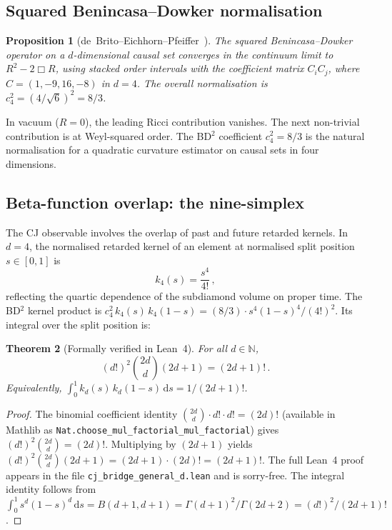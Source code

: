 \documentclass[12pt,a4paper]{article}
\theoremstyle{plain}
\newtheorem{theorem}{Theorem}[section]
\newtheorem{proposition}[theorem]{Proposition}
\theoremstyle{definition}
\theoremstyle{remark}
\newcommand{\dd}{\mathrm{d}}
\begin{document}
\subsection{Squared Benincasa--Dowker normalisation}
\label{sec:bd2}

\begin{proposition}[de~Brito--Eichhorn--Pfeiffer~\cite{deBrito:2023}]
\label{prop:bd2}
The squared Benincasa--Dowker operator on a $d$-dimensional causal
set converges in the continuum limit to $R^2 - 2\Box R$, using
stacked order intervals with the coefficient matrix $C_i C_j$, where
$C = (1, -9, 16, -8)$ in $d = 4$.  The overall normalisation is
$c_4^2 = (4/\sqrt{6})^2 = 8/3$.
\end{proposition}

In vacuum ($R = 0$), the leading Ricci contribution vanishes.  The
next non-trivial contribution is at Weyl-squared order.  The BD${}^2$
coefficient $c_4^2 = 8/3$ is the natural normalisation for a
quadratic curvature estimator on causal sets in four dimensions.

\subsection{Beta-function overlap: the nine-simplex}
\label{sec:beta}

The CJ observable involves the overlap of past and future
retarded kernels.  In $d = 4$, the normalised retarded kernel of an
element at normalised split position $s \in [0,1]$ is
\begin{equation}\label{eq:kernel}
  k_4(s) = \frac{s^4}{4!}\,,
\end{equation}
reflecting the quartic dependence of the subdiamond volume on proper
time.  The BD${}^2$ kernel product is
$c_4^2\, k_4(s)\, k_4(1-s) = (8/3) \cdot s^4(1-s)^4 / (4!)^2$.
Its integral over the split position is:

\begin{theorem}[Formally verified in Lean~4]
\label{thm:beta}
For all $d \in \mathbb{N}$,
\begin{equation}\label{eq:beta-general}
  (d!)^2 \binom{2d}{d} (2d+1) = (2d+1)!\,.
\end{equation}
Equivalently, $\int_0^1 k_d(s)\, k_d(1-s)\,\dd s = 1/(2d+1)!$.
\end{theorem}

\begin{proof}
The binomial coefficient identity
$\binom{2d}{d} \cdot d! \cdot d! = (2d)!$ (available in Mathlib as
\texttt{Nat.choose\_mul\_factorial\_mul\_factorial}) gives
$(d!)^2 \binom{2d}{d} = (2d)!$.  Multiplying by $(2d+1)$ yields
$(d!)^2 \binom{2d}{d} (2d+1) = (2d+1) \cdot (2d)! = (2d+1)!$.
The full Lean~4 proof appears in the file
\texttt{cj\_bridge\_general\_d.lean} and is sorry-free.  The
integral identity follows from
$\int_0^1 s^d (1-s)^d\,\dd s = B(d+1, d+1) =
\Gamma(d+1)^2 / \Gamma(2d+2) = (d!)^2 / (2d+1)!$.
\end{proof}
\end{document}
